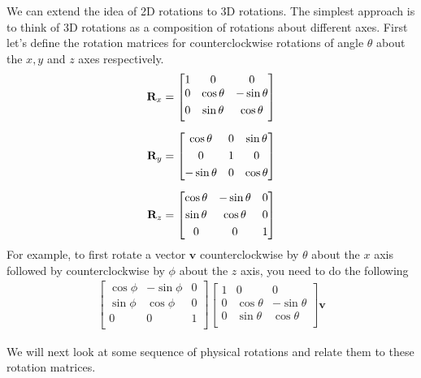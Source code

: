We can extend the idea of 2D rotations to 3D rotations. The simplest approach is to think of 3D rotations as a composition of rotations about different axes. First let's define the rotation matrices for counterclockwise rotations of angle $\theta$ about the $x, y$ and $z$ axes respectively.
\begin{align}
\mathbf{R}_{x} &= \begin{bmatrix}
1 & 0 & 0 \\
0 & \cos \theta &  -\sin \theta \\[3pt]
0 & \sin \theta  &  \cos \theta \\[3pt]
\end{bmatrix} \\[6pt]
\mathbf{R}_{y} &= \begin{bmatrix}
\cos \theta & 0 & \sin \theta \\[3pt]
0 & 1 & 0 \\[3pt]
-\sin \theta & 0 & \cos \theta \\
\end{bmatrix} \\[6pt]
\mathbf{R}_{z} &= \begin{bmatrix}
\cos \theta &  -\sin \theta & 0 \\[3pt]
\sin \theta &   \cos \theta & 0\\[3pt]
0 & 0 & 1\\
\end{bmatrix}
\end{align}
For example, to first rotate a vector $\mathbf{v}$ counterclockwise by $\theta$ about the $x$ axis followed by counterclockwise by $\phi$ about the $z$ axis, you need to do the following
\begin{align}
\begin{bmatrix}
\cos \phi &  -\sin \phi & 0 \\[3pt]
\sin \phi &   \cos \phi & 0 \\[3pt]
0 & 0 & 1\\
\end{bmatrix}
\begin{bmatrix}
1 & 0 & 0 \\
0 & \cos \theta &  -\sin \theta \\[3pt]
0 & \sin \theta  &  \cos \theta \\[3pt]
\end{bmatrix}
\mathbf{v}
\end{align}


We will next look at some sequence of physical rotations and relate them to these rotation matrices.

